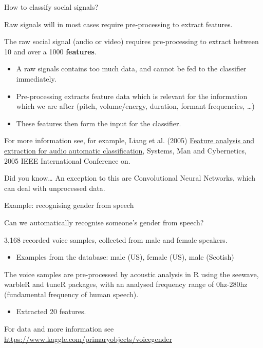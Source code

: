 \documentclass[compress]{beamer}
\providecommand{\tightlist}{%
  \setlength{\itemsep}{0pt}\setlength{\parskip}{0pt}}
\begin{document}
\begin{frame}{How to classify social signals?}

Raw signals will in most cases require pre-processing to extract
features.

The raw social signal (audio or video) requires pre-processing to
extract between 10 and over a 1000 \textbf{features}.

\begin{itemize}
\tightlist
\item
  A raw signals contains too much data, and cannot be fed to the
  classifier immediately.
\item
  Pre-processing extracts feature data which is relevant for the
  information which we are after (pitch, volume/energy, duration,
  formant frequencies, \ldots{})
\item
  These features then form the input for the classifier.
\end{itemize}

For more information see, for example, Liang et al. (2005)
\href{http://ieeexplore.ieee.org/xpls/icp.jsp?arnumber=1571239}{Feature
analysis and extraction for audio automatic classification}, Systems,
Man and Cybernetics, 2005 IEEE International Conference on.

Did you know\ldots{} An exception to this are Convolutional Neural
Networks, which can deal with unprocessed data.

\end{frame}

\begin{frame}{Example: recognising gender from speech}

Can we automatically recognise someone's gender from speech?

3,168 recorded voice samples, collected from male and female speakers.

\begin{itemize}
\tightlist
\item
  Examples from the database: male (US), female (US), male (Scotish)
\end{itemize}

The voice samples are pre-processed by acoustic analysis in R using the
seewave, warbleR and tuneR packages, with an analysed frequency range of
0hz-280hz (fundamental frequency of human speech).

\begin{itemize}
\tightlist
\item
  Extracted 20 features.
\end{itemize}

For data and more information see
\url{https://www.kaggle.com/primaryobjects/voicegender}

\end{frame}
\end{document}
